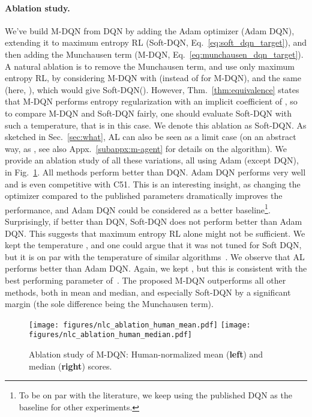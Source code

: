 \documentclass{article}
\begin{document}
\paragraph{Ablation study.} \label{subsec:ablatioen}
We've build M-DQN from DQN by adding the Adam optimizer (Adam DQN), extending it to maximum entropy RL (Soft-DQN, Eq.~\eqref{eq:soft_dqn_target}), and then adding the Munchausen term (M-DQN, Eq.~\eqref{eq:munchausen_dqn_target}). A natural ablation is to remove the Munchausen term, and use only maximum entropy RL, by considering M-DQN with  (instead of  for M-DQN), and the same  (here, ), which would give Soft-DQN(). However, Thm.~\ref{thm:equivalence} states that M-DQN performs entropy regularization with an implicit coefficient of , so to compare M-DQN and Soft-DQN fairly, one should evaluate Soft-DQN with such a temperature, that is  in this case. We denote this ablation as Soft-DQN.
As sketched in Sec.~\ref{sec:what}, AL can also be seen as a limit case (on an abstract way, as , see also Appx.~\ref{subappx:m-agent} for details on the algorithm). 
We provide an ablation study of all these variations, all using Adam (except DQN), in Fig.~\ref{fig:ablation}.
All methods perform better than DQN. Adam DQN performs very well and is even competitive with C51. This is an interesting insight, as changing the optimizer compared to the published parameters dramatically improves the performance, and Adam DQN could be considered as a better baseline\footnote{To be on par with the literature, we keep using the published DQN as the baseline for other experiments.}. Surprisingly, if better than DQN, Soft-DQN does not perform better than Adam DQN. This suggests that maximum entropy RL alone might not be sufficient. We kept the temperature , and one could argue that it was not tuned for Soft DQN, but it is on par with the temperature of similar algorithms~\cite{song2018revisiting,vieillard2020leverage}. We observe that AL performs better than Adam DQN. Again, we kept , but this is consistent with the best performing parameter of~\citet[\textit{e.g.},~Fig.~7]{bellemare2016increasing}. The proposed M-DQN outperforms all other methods, both in mean and median, and especially Soft-DQN by a significant margin (the sole difference being the Munchausen term).

\begin{figure}
    \centering
    \texttt{[image: figures/nlc\_ablation\_human\_mean.pdf]}
    \texttt{[image: figures/nlc\_ablation\_human\_median.pdf]}
    \caption{Ablation study of M-DQN: Human-normalized mean (\textbf{left}) and median (\textbf{right}) scores.}
    \label{fig:ablation}
\end{figure}
\end{document}
